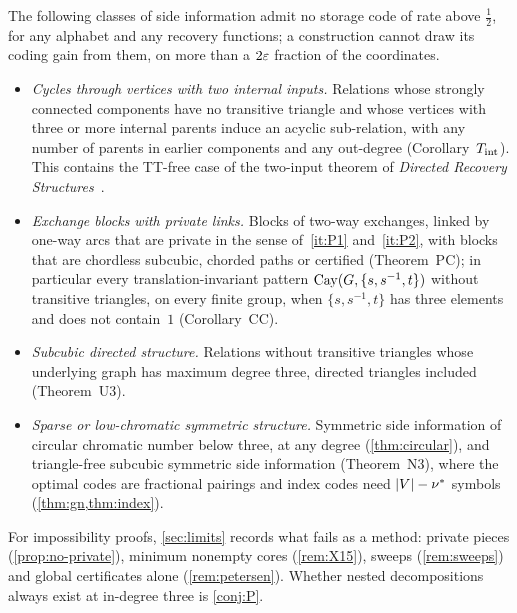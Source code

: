 The following classes of side information admit no storage code of rate above $\frac12$, for any alphabet and any
recovery functions; a construction cannot draw its coding gain from them, on more than a $2\varepsilon$ fraction of the
coordinates.
\begin{itemize}[leftmargin=2em]
\item \emph{Cycles through vertices with two internal inputs.} Relations whose strongly connected components have no
transitive triangle and whose vertices with three or more internal parents induce an acyclic sub-relation, with any number
of parents in earlier components and any out-degree (Corollary~$T_{\mathrm{int}}$). This contains the TT-free case of the two-input
theorem of \emph{Directed Recovery Structures}~\cite[Theorem~5.1]{DirectedRecovery2026}.
\item \emph{Exchange blocks with private links.} Blocks of two-way exchanges, linked by one-way arcs that are private in the
sense of~\ref{it:P1} and~\ref{it:P2}, with blocks that are chordless subcubic, chorded paths or certified (Theorem~PC);
in particular every translation-invariant pattern $\operatorname{Cay}(G,\{s,s^{-1},t\})$ without transitive triangles, on every finite
group, when $\{s,s^{-1},t\}$ has three elements and does not contain~$1$ (Corollary~CC).
\item \emph{Subcubic directed structure.} Relations without transitive triangles whose underlying graph has maximum degree
three, directed triangles included (Theorem~U3).
\item \emph{Sparse or low-chromatic symmetric structure.} Symmetric side information of circular chromatic number below
three, at any degree (\cref{thm:circular}), and triangle-free subcubic symmetric side information (Theorem~N3), where
the optimal codes are fractional pairings and index codes need $\lvert V \rvert-\nu^{*}$ symbols (\cref{thm:gn,thm:index}).
\end{itemize}
For impossibility proofs, \cref{sec:limits} records what fails as a method: private pieces (\cref{prop:no-private}),
minimum nonempty cores (\cref{rem:X15}), sweeps (\cref{rem:sweeps}) and global certificates alone (\cref{rem:petersen}).
Whether nested decompositions always exist at in-degree three is \cref{conj:P}.
